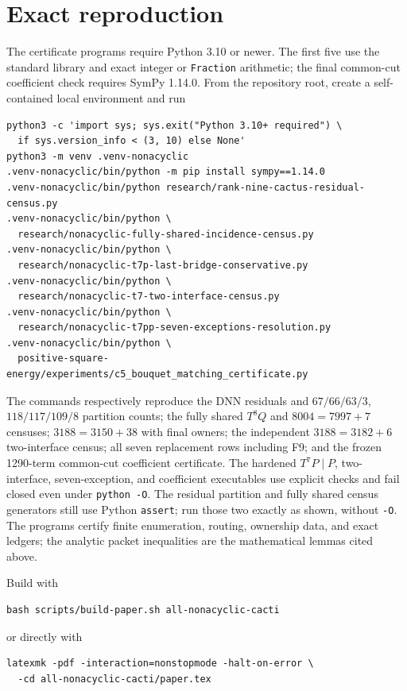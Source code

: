 \documentclass[11pt]{article}
\begin{document}
\appendix
\section{Exact reproduction}\label{app:reproduction}

The certificate programs require Python 3.10 or newer.  The first five use the
standard library and exact integer or \texttt{Fraction} arithmetic; the final
common-cut coefficient check requires SymPy 1.14.0.  From the repository root,
create a self-contained local environment and run
\begin{verbatim}
python3 -c 'import sys; sys.exit("Python 3.10+ required") \
  if sys.version_info < (3, 10) else None'
python3 -m venv .venv-nonacyclic
.venv-nonacyclic/bin/python -m pip install sympy==1.14.0
.venv-nonacyclic/bin/python research/rank-nine-cactus-residual-census.py
.venv-nonacyclic/bin/python \
  research/nonacyclic-fully-shared-incidence-census.py
.venv-nonacyclic/bin/python \
  research/nonacyclic-t7p-last-bridge-conservative.py
.venv-nonacyclic/bin/python \
  research/nonacyclic-t7-two-interface-census.py
.venv-nonacyclic/bin/python \
  research/nonacyclic-t7pp-seven-exceptions-resolution.py
.venv-nonacyclic/bin/python \
  positive-square-energy/experiments/c5_bouquet_matching_certificate.py
\end{verbatim}
The commands respectively reproduce the DNN residuals and $67/66/63/3$,
$118/117/109/8$ partition counts; the fully shared $T^8Q$ and
$8004=7997+7$ censuses; $3188=3150+38$ with final owners; the independent
$3188=3182+6$ two-interface census; all seven replacement rows including F9;
and the frozen 1290-term common-cut coefficient certificate.  The hardened
$T^7P\mid P$, two-interface, seven-exception, and coefficient executables use
explicit checks and fail closed even under \texttt{python -O}.  The residual
partition and fully shared census generators still use Python \texttt{assert};
run those two exactly as shown, without \texttt{-O}.  The
programs certify finite enumeration, routing, ownership data, and exact
ledgers; the analytic packet inequalities are the mathematical lemmas cited
above.

Build with
\begin{verbatim}
bash scripts/build-paper.sh all-nonacyclic-cacti
\end{verbatim}
or directly with
\begin{verbatim}
latexmk -pdf -interaction=nonstopmode -halt-on-error \
  -cd all-nonacyclic-cacti/paper.tex
\end{verbatim}
\end{document}
